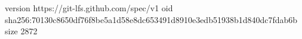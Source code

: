 version https://git-lfs.github.com/spec/v1
oid sha256:70130c8650df76f8be5a1d58e8dc653491d8910e3edb51938b1d840dc7fdab6b
size 2872
